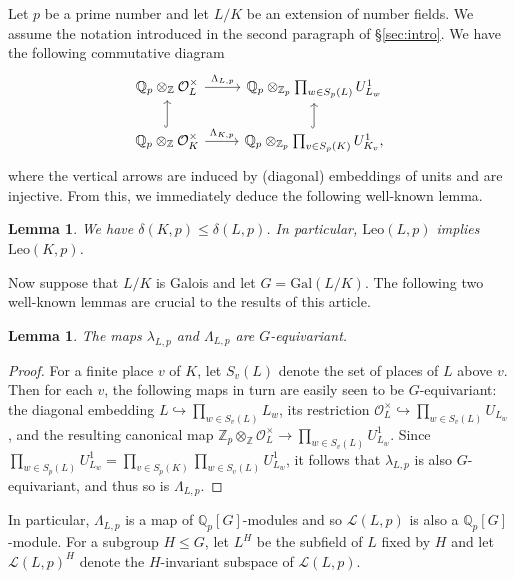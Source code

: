 \documentclass[12pt]{amsart}
\theoremstyle{plain}
\newtheorem{lemma}[theorem]{Lemma}
\theoremstyle{remark}
\theoremstyle{definition}
\newcommand{\Z}{\mathbb{Z}}
\newcommand{\Q}{\mathbb{Q}}
\newcommand{\Gal}{\mathrm{Gal}}
\newcommand{\Leo}{\mathrm{Leo}}
\numberwithin{equation}{section}
\begin{document}
Let $p$ be a prime number and let $L/K$ be an extension of number fields. 
We assume the notation introduced in the second paragraph of \S \ref{sec:intro}.
We have the following commutative diagram
\begin{equation}\label{diagram:ext-number-fields}
\begin{tikzcd}
\Q_{p} \otimes_{\Z} \mathcal{O}_{L}^{\times} \arrow{r}{\Lambda_{L,p}}  & 
\Q_{p} \otimes_{\Z_{p}} \prod_{w \in S_{p}(L)}U_{L_{w}}^{1}  \\
\Q_{p} \otimes_{\Z} \mathcal{O}_{K}^{\times} \arrow[hookrightarrow]{u}{}\arrow{r}{\Lambda_{K,p}} & \Q_{p} \otimes_{\Z_{p}} \prod_{v \in S_{p}(K)}U_{K_{v}}^{1} \arrow[hookrightarrow]{u}{},
\end{tikzcd}
\end{equation}
where the vertical arrows are induced by (diagonal) embeddings of units and are injective. 
From this, we immediately deduce the following well-known lemma.

\begin{lemma}\label{lem:defectgrows}
We have $\delta(K,p) \leq \delta(L,p)$. In particular, $\Leo(L,p)$ implies $\Leo(K,p)$.
\end{lemma}

Now suppose that $L/K$ is Galois and let $G=\Gal(L/K)$. 
The following two well-known lemmas are crucial to the results of this article.

\begin{lemma}
The maps $\lambda_{L,p}$ and $\Lambda_{L,p}$ are $G$-equivariant. 
\end{lemma}

\begin{proof}
For a finite place $v$ of $K$, let $S_{v}(L)$ denote the set of places of $L$ above $v$. 
Then for each $v$, the following maps in turn are easily seen to be $G$-equivariant:
the diagonal embedding $L \hookrightarrow \prod_{w \in S_{v}(L)} L_{w}$, 
its restriction $\mathcal{O}_{L}^{\times} \hookrightarrow \prod_{w \in S_{v}(L)} U_{L_{w}}$,
and the resulting canonical map 
$\Z_{p} \otimes_{\Z} \mathcal{O}_{L}^{\times} \rightarrow \prod_{w \in S_{v}(L)} U_{L_{w}}^{1}$.
Since $\prod_{w \in S_{p}(L)} U^{1}_{L_{w}} = \prod_{v \in S_{p}(K)} \prod_{w \in S_{v}(L)} U^{1}_{L_{w}}$,
it follows that $\lambda_{L,p}$ is also $G$-equivariant, and thus so is $\Lambda_{L,p}$.
\end{proof}

In particular, $\Lambda_{L,p}$ is a map of $\Q_{p}[G]$-modules and so $\mathcal{L}(L,p)$ is also a $\Q_{p}[G]$-module.
For a subgroup $H \leq G$, let $L^{H}$ be the subfield of $L$ fixed by $H$
and let $\mathcal{L}(L,p)^{H}$ denote the $H$-invariant subspace of $\mathcal{L}(L,p)$.
\end{document}
